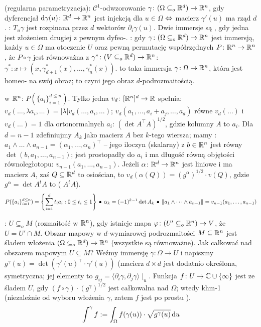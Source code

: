   (regularna parametryzacja): $\mathscr C^1$-odwzorowanie $\gamma \colon (\Omega \subseteq_o \mathbb{R}^d) \to \mathbb{R}^n$, gdy dyferencjał $\textrm{d}\gamma(u) \colon \mathbb{R}^d \to \mathbb{R}^n$ jest injekcją dla $u \in \Omega$ $\Leftrightarrow$ macierz $\gamma'(u)$ ma rząd $d$.
: $T_u \gamma$ jest rozpinana przez $d$ wektorów $\partial_i \gamma(u)$.
Dwie immersje są , gdy jedna jest złożeniem drugiej z pewnym dyfeo-.
: gdy $\gamma \colon (\Omega \subseteq_o \mathbb{R}^d) \to \mathbb{R}^n$ jest immersją, każdy $u \in \Omega$ ma otoczenie $U$ oraz pewną permutację współrzędnych $P \colon \mathbb{R}^n \to \mathbb{R}^n$, że $P \circ \gamma$ jest równoważna z $\gamma^* \colon (V \subseteq_o \mathbb{R}^d) \to \mathbb{R}^n$: $\gamma^* \colon x \mapsto (x, \gamma^*_{d+1} (x), \ldots, \gamma_n^*(x))$. 
 to taka immersja $\gamma \colon \Omega \to \mathbb{R}^n$, która jest homeo- na swój obraz; to czyni jego obraz $d$-podrozmaitością.

  w $\mathbb{R}^n$: $P(\{a_i\}_{i=1}^{d \le n})$.
Tylko jedna $v_d \colon [\mathbb{R}^n]^d \to \mathbb{R}$ spełnia: $v_d(\dots, \lambda a_i, \dots) = |\lambda| v_d(\dots, a_i, \dots)$; $v_d(a_1, \dots, a_i + a_j, \dots, a_d)$ równe $v_d(\dots)$ i $v_d(\ldots) = 1$ dla ortonormalnych $a_i$: $(\det A^\top A)^{1/2}$, gdzie kolumny $A$ to $a_i$.
Dla $d = n-1$ zdefiniujmy $A_k$ jako macierz $A$ bez $k$-tego wiersza; mamy : $a_1 \wedge \dots \wedge a_{n-1} = (\alpha_1, \dots, \alpha_n)^\top$ -- jego iloczyn (skalarny) z $b \in \mathbb{R}^n$ jest równy $\det(b, a_1, \ldots, a_{n-1})$; jest prostopadły do $a_i$ i ma długość równą objętości równoległotopu: $v_{n-1} (a_1,\dots, a_{n-1})$.
Jeżeli $\alpha \colon \mathbb{R}^d \to \mathbb{R}^n$ jest liniowe i ma macierz $A$, zaś $Q \subseteq \mathbb{R}^d$ to osiościan, to $v_d(\alpha(Q)) = (g^\alpha)^{1/2} \cdot v(Q)$, gdzie $g^\alpha = \det A^t A$ to  ( $A^tA$).
\[
	P(\{a_i\}_{i=1}^{d \le n}) = \left\{\sum_{i=1}^d t_ia_i : 0 \le t_i \le 1\right\} \, \bullet \,
	\alpha_k = (-1)^{k-1} \det A_k \, \bullet \,
	\| a_1 \wedge \dots \wedge a_{n-1}\| = v_{n-1} (a_1,\dots, a_{n-1})
\]

:  $U \subseteq_o M$ (rozmaitość w $\mathbb{R}^n$), gdy istnieje mapa $\varphi \colon (U' \subseteq_o \mathbb{R}^n) \to V$, że $U = U' \cap M$.
Obszar mapowy w $d$-wymiarowej podrozmaitości $M \subseteq \mathbb{R}^n$ jest śladem włożenia $(\Omega \subseteq_o \mathbb{R}^d) \to \mathbb{R}^n$ (wszystkie są równoważne).
Jak całkować nad obszarem mapowym $U \subseteq M$?
Weźmy immersję $\gamma \colon \Omega \to U$ i napiszmy  $g^\gamma(u) = \det (\gamma'(u)^\top \cdot \gamma'(u))$ (macierz $d\times d$ jest dodatnio określona, symetryczna; jej elementy to $g_{ij} = \langle \partial_i \gamma, \partial_j \gamma \rangle \mid_u$.
Funkcja $f \colon U \to \mathbb{C} \cup \{\infty\}$ jest  ze śladem $U$, gdy $(f \circ \gamma) \cdot (g^\gamma)^{1/2}$ jest całkowalna nad $\Omega$; wtedy khm-1 (niezależnie od wyboru włożenia $\gamma$, zatem $f$ jest po prostu ).
\[
	\int^\gamma f := \int_\Omega f(\gamma(u)) \cdot \sqrt{g^\gamma(u)} \,\textrm{d} u
\]

